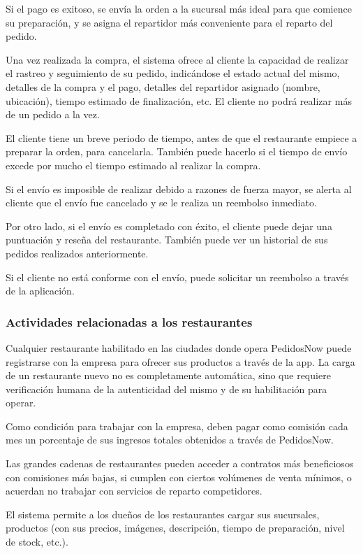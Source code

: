 Si el pago es exitoso, se envía la orden a la sucursal más ideal para que comience su preparación, y se asigna el repartidor más conveniente para el reparto del pedido.

Una vez realizada la compra, el sistema ofrece al cliente la capacidad de realizar el rastreo y seguimiento de su pedido, indicándose el estado actual del mismo, detalles de la compra y el pago, detalles del repartidor asignado (nombre, ubicación), tiempo estimado de finalización, etc. El cliente no podrá realizar más de un pedido a la vez.

El cliente tiene un breve periodo de tiempo, antes de que el restaurante empiece a preparar la orden, para cancelarla. También puede hacerlo si el tiempo de envío excede por mucho el tiempo estimado al realizar la compra.

Si el envío es imposible de realizar debido a razones de fuerza mayor, se alerta al cliente que el envío fue cancelado y se le realiza un reembolso inmediato.

Por otro lado, si el envío es completado con éxito, el cliente puede dejar una puntuación y reseña del restaurante. También puede ver un historial de sus pedidos realizados anteriormente.

Si el cliente no está conforme con el envío, puede solicitar un reembolso a través de la aplicación.

\subsubsection{Actividades relacionadas a los restaurantes}

Cualquier restaurante habilitado en las ciudades donde opera PedidosNow puede registrarse con la empresa para ofrecer sus productos a través de la app. La carga de un restaurante nuevo no es completamente automática, sino que requiere verificación humana de la autenticidad del mismo y de su habilitación para operar.

Como condición para trabajar con la empresa, deben pagar como comisión cada mes un porcentaje de sus ingresos totales obtenidos a través de PedidosNow.

Las grandes cadenas de restaurantes pueden acceder a contratos más beneficiosos con comisiones más bajas, si cumplen con ciertos volúmenes de venta mínimos, o acuerdan no trabajar con servicios de reparto competidores.

El sistema permite a los dueños de los restaurantes cargar sus sucursales, productos (con sus precios, imágenes, descripción, tiempo de preparación, nivel de stock, etc.).

